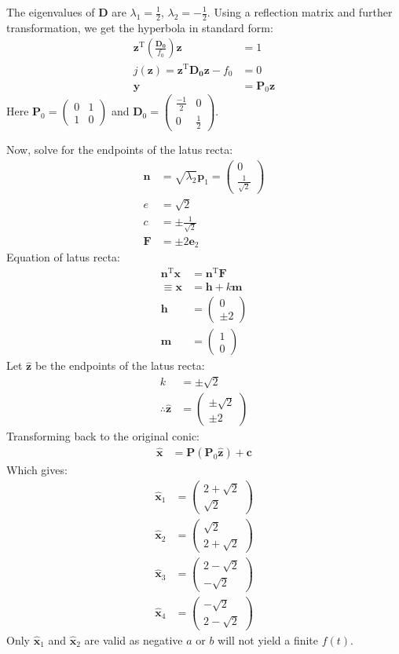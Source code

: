 \documentclass[conference]{IEEEtran}
\theoremstyle{remark}
\providecommand{\brak}[1]{\ensuremath{\left(#1\right)}}
\newcommand{\myvec}[1]{\ensuremath{\begin{pmatrix}#1\end{pmatrix}}}
\renewcommand{\vec}[1]{\boldsymbol{\mathbf{#1}}}
\begin{document}
	The eigenvalues of $\vec{D}$ are $\lambda_1 = \frac{1}{2}$, $\lambda_2=-\frac{1}{2}$. Using a reflection matrix and further transformation, we get the hyperbola in standard form:
	\begin{align}
		\vec{z}^\text{T}\brak{\frac{\vec{D_0}}{f_0}}\vec{z} &= 1\\
		j(\vec{z}) = \vec{z}^\text{T}\vec{D_0}\vec{z} - f_0 &= 0  \label{standard_conic}\\
		\vec{y} &= \vec{P}_0\vec{z} \label{t2}
	\end{align}
	Here $\vec{P}_0 = \myvec{0 & 1 \\ 1 & 0}$ and $\vec{D}_0 = \myvec{\frac{-1}{2} & 0 \\ 0 & \frac{1}{2}}$.
	
	Now, solve for the endpoints of the latus recta:
	\begin{align}
		\vec{n} &= \sqrt{\lambda_2}\vec{p}_1 = \myvec{0 \\ \frac{1}{\sqrt{2}}}\\
		e &= \sqrt{2}\\
		c &= \pm \frac{1}{\sqrt{2}}\\
		\vec{F} &= \pm 2 \vec{e}_2
	\end{align}
	Equation of latus recta:
	\begin{align}
		\vec{n}^\text{T}\vec{x} &= \vec{n}^\text{T}\vec{F}\\
		\equiv \vec{x} &= \vec{h} + k\vec{m} \label{latus_rectum}\\
		\vec{h} &= \myvec{0 \\ \pm 2}\\
		\vec{m} &= \myvec{1 \\ 0}
	\end{align}
	Let $\vec{\hat{z}}$ be the endpoints of the latus recta:
	\begin{align}
		k &= \pm \sqrt{2}\\
		\therefore \vec{\hat{z}} &= \myvec{\pm \sqrt{2} \\ \pm 2}
	\end{align}
	Transforming back to the original conic:
	\begin{align}
		\vec{\hat{x}} &= \vec{P}\brak{\vec{P}_0 \vec{\hat{z}}} + \vec{c}
	\end{align}
	Which gives:
	\begin{align*}
		\vec{\hat{x}}_1 &= \myvec{2+\sqrt{2} \\ \sqrt{2}}\\
		\vec{\hat{x}}_2 &= \myvec{\sqrt{2} \\ 2+\sqrt{2}}\\
		\vec{\hat{x}}_3 &= \myvec{2-\sqrt{2} \\ -\sqrt{2}}\\
		\vec{\hat{x}}_4 &= \myvec{-\sqrt{2} \\ 2-\sqrt{2}}
	\end{align*}
	Only $\vec{\hat{x}}_1$ and $\vec{\hat{x}}_2$ are valid as negative $a$ or $b$ will not yield a finite $f(t)$.
	
\end{document}
